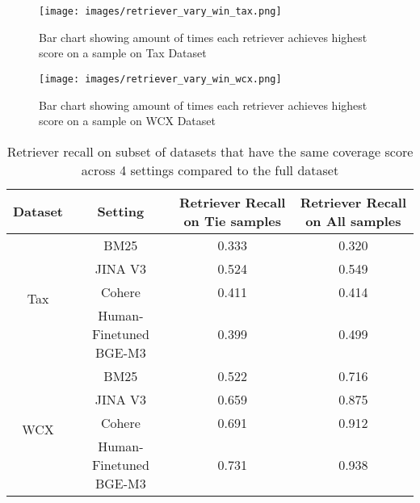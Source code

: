 \begin{figure}[H]
\centering
\begin{minipage}{0.48\textwidth}
    \centering
    \texttt{[image: images/retriever\_vary\_win\_tax.png]}  %
    \caption{Bar chart showing amount of times each retriever achieves highest score on a sample on Tax Dataset}
    \label{fig:retriever_vary_win_tax}
\end{minipage}
\hfill
\begin{minipage}{0.48\textwidth}
    \centering
    \texttt{[image: images/retriever\_vary\_win\_wcx.png]}  %
    \caption{Bar chart showing amount of times each retriever achieves highest score on a sample on WCX Dataset}
    \label{fig:retriever_vary_win_wcx}
\end{minipage}
\end{figure}

\begin{table}[ht]
\centering
\caption{Retriever recall on subset of datasets that have the same coverage score across 4 settings compared to the full dataset}
\renewcommand{\arraystretch}{1.5} %
\label{table: retrieval_e2e_subset}
\begin{tabular}{@{}cccc@{}}
\toprule
Dataset              & Setting                & Retriever Recall on Tie samples & Retriever Recall on All samples \\ \midrule
\multirow{4}{*}{Tax} & BM25                   & 0.333                           & 0.320                           \\
                     & JINA V3                & 0.524                           & 0.549                           \\
                     & Cohere                 & 0.411                           & 0.414                           \\
                     & Human-Finetuned BGE-M3 & 0.399                           & 0.499                           \\ \midrule
\multirow{4}{*}{WCX} & BM25                   & 0.522                           & 0.716                           \\
                     & JINA V3                & 0.659                           & 0.875                           \\
                     & Cohere                 & 0.691                           & 0.912                           \\
                     & Human-Finetuned BGE-M3 & 0.731                           & 0.938                           \\ \bottomrule
\end{tabular}

\end{table}

